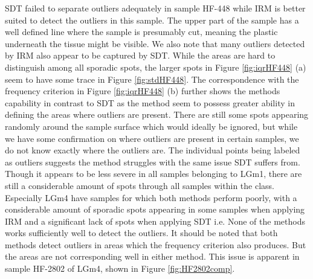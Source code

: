 SDT failed to separate outliers adequately in sample HF-448 while IRM is better suited to detect the outliers in this sample. The upper part of the sample has a well defined line where the sample is presumably cut, meaning the plastic underneath the tissue might be visible. We also note that many outliers detected by IRM also appear to be captured by SDT. While the areas are hard to distinguish among all sporadic spots, the larger spots in Figure \ref{fig:iqrHF448} (a) seem to have some trace in Figure \ref{fig:stdHF448}. The correspondence with the frequency criterion in Figure \ref{fig:iqrHF448} (b) further shows the methods capability in contrast to SDT as the method seem to possess greater ability in defining the areas where outliers are present. There are still some spots appearing randomly around the sample surface which would ideally be ignored, but while we have some confirmation on where outliers are present in certain samples, we do not know exactly where the outliers are. The individual points being labeled as outliers suggests the method struggles with the same issue SDT suffers from. Though it appears to be less severe in all samples belonging to LGm1, there are still a considerable amount of spots through all samples within the class. Especially LGm4 have samples for which both methods perform poorly, with a considerable amount of sporadic spots appearing in some samples when applying IRM and a significant lack of spots when applying SDT i.e. None of the methods works sufficiently well to detect the outliers. It should be noted that both methods detect outliers in areas which the frequency criterion also produces. But the areas are not corresponding well in either method. This issue is apparent in sample HF-2802 of LGm4, shown in Figure \ref{fig:HF2802comp}.

